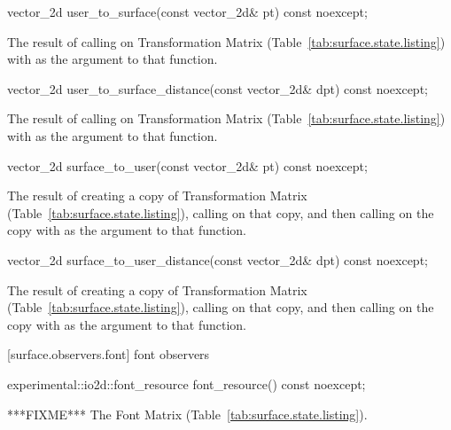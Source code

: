 \begin{itemdecl}
vector_2d user_to_surface(const vector_2d& pt) const noexcept;
\end{itemdecl}
\begin{itemdescr}
\pnum
\returns
The result of calling  on Transformation Matrix (Table~\ref{tab:surface.state.listing}) with  as the argument to that function.
\end{itemdescr}

\begin{itemdecl}
vector_2d user_to_surface_distance(const vector_2d& dpt) const noexcept;
\end{itemdecl}
\begin{itemdescr}
\pnum
\returns
The result of calling  on Transformation Matrix (Table~\ref{tab:surface.state.listing}) with  as the argument to that function.
\end{itemdescr}

\begin{itemdecl}
vector_2d surface_to_user(const vector_2d& pt) const noexcept;
\end{itemdecl}
\begin{itemdescr}
\pnum
\returns
The result of creating a copy of Transformation Matrix (Table~\ref{tab:surface.state.listing}), calling  on that copy, and then calling  on the copy with  as the argument to that function.
\end{itemdescr}

\begin{itemdecl}
vector_2d surface_to_user_distance(const vector_2d& dpt) const noexcept;
\end{itemdecl}
\begin{itemdescr}
\pnum
\returns
The result of creating a copy of Transformation Matrix (Table~\ref{tab:surface.state.listing}), calling  on that copy, and then calling  on the copy with  as the argument to that function.
\end{itemdescr}

 [surface.observers.font] { font observers}

\begin{itemdecl}
experimental::io2d::font_resource font_resource() const noexcept;
\end{itemdecl}
\begin{itemdescr}
\pnum
\returns
***FIXME*** The Font Matrix (Table~\ref{tab:surface.state.listing}).
\end{itemdescr}
